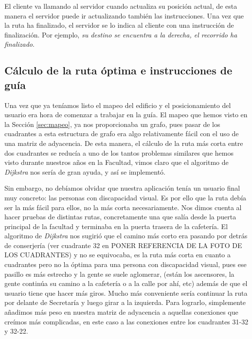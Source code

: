 El cliente va llamando al servidor cuando actualiza su posición actual, de esta manera el servidor puede ir actualizando también las instrucciones. Una vez que la ruta ha finalizado, el servidor se lo indica al cliente con una instrucción de finalización. Por ejemplo, \textit{su destino se encuentra a la derecha, el recorrido ha finalizado}.

\subsection{Cálculo de la ruta óptima e instrucciones de guía}

Una vez que ya teníamos listo el mapeo del edificio y el posicionamiento del usuario era hora de comenzar a trabajar en la guía. El mapeo que hemos visto en la Sección \ref{sec:mapeo}, ya nos proporcionaba un grafo, pues pasar de los cuadrantes a esta estructura de grafo era algo relativamente fácil con el uso de una matriz de adyacencia. De esta manera, el cálculo de la ruta más corta entre dos cuadrantes se reducía a uno de los tantos problemas similares que hemos visto durante nuestros años en la Facultad, vimos claro que el algoritmo de \textit{ Dijkstra} nos sería de gran ayuda, y así se implementó.

Sin embargo, no debíamos olvidar que nuestra aplicación tenía un usuario final muy concreto: las personas con discapacidad visual. Es por ello que la ruta debía ser la más fácil para ellos, no la más corta necesariamente. Nos dimos cuenta al hacer pruebas de distintas rutas, concretamente una que salía desde la puerta principal de la facultad y terminaba en la puerta trasera de la cafetería. El algoritmo de \textit{Dijkstra} nos sugirió que el camino más corto era pasando por detrás de conserjería (ver cuadrante 32 en PONER REFERENCIA DE LA FOTO DE LOS CUADRANTES) y no se equivocaba, es la ruta más corta en cuanto a cuadrantes pero no la óptima para una persona con discapacidad visual, pues ese pasillo es más estrecho y la gente se suele aglomerar, (están los ascensores, la gente continúa su camino a la cafetería o a la calle por ahí, etc) además de que el usuario tiene que hacer más giros. Mucho más conveniente sería continuar la ruta por delante de Secretaría y luego girar a la izquierda. Para lograrlo, simplemente añadimos más peso en nuestra matriz de adyacencia a aquellas conexiones que creímos más complicadas, en este caso a las conexiones entre los cuadrantes 31-32 y 32-22.